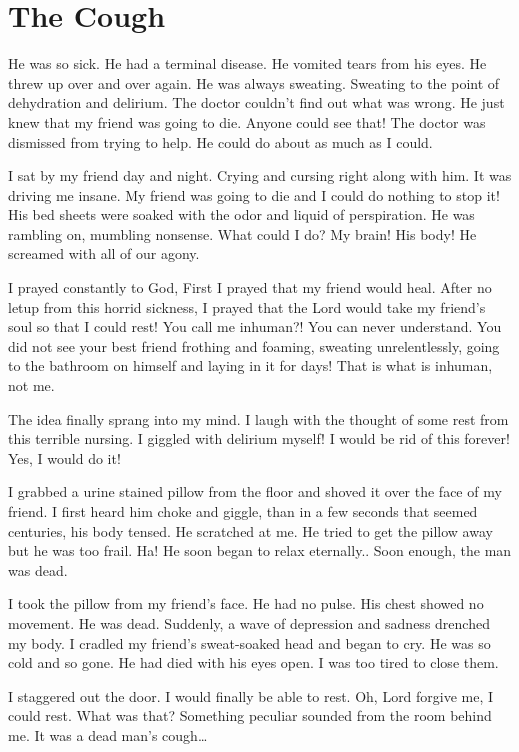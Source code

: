 \chapter{The Cough}

He was so sick. He had a terminal disease. He vomited tears from his
eyes. He threw up over and over again. He was always sweating. Sweating
to the point of dehydration and delirium. The doctor couldn't find out
what was wrong. He just knew that my friend was going to die. Anyone
could see that! The doctor was dismissed from trying to help. He could
do about as much as I could.

I sat by my friend day and night. Crying and cursing right along with
him. It was driving me insane. My friend was going to die and I could do
nothing to stop it! His bed sheets were soaked with the odor and liquid
of perspiration. He was rambling on, mumbling nonsense. What could I do?
My brain! His body! He screamed with all of our agony.

I prayed constantly to God, First I prayed that my friend would
heal. After no letup from this horrid sickness, I prayed that the Lord
would take my friend's soul so that I could rest! You call me inhuman?!
You can never understand. You did not see your best friend frothing and
foaming, sweating unrelentlessly, going to the bathroom on himself and
laying in it for days! That is what is inhuman, not me.

The idea finally sprang into my mind. I laugh with the thought of some
rest from this terrible nursing. I giggled with delirium myself! I would
be rid of this forever! Yes, I would do it!

I grabbed a urine stained pillow from the floor and shoved it over the
face of my friend. I first heard him choke and giggle, than in a few
seconds that seemed centuries, his body tensed. He scratched at me. He
tried to get the pillow away but he was too frail. Ha! He soon began to
relax eternally.. Soon enough, the man was dead.

I took the pillow from my friend's face. He had no pulse. His chest
showed no movement. He was dead. Suddenly, a wave of depression and
sadness drenched my body. I cradled my friend's sweat-soaked head and
began to cry. He was so cold and so gone. He had died with his eyes
open. I was too tired to close them.

I staggered out the door. I would finally be able to rest. Oh, Lord
forgive me, I could rest. What was that? Something peculiar sounded from
the room behind me. It was a dead man's cough\ldots
